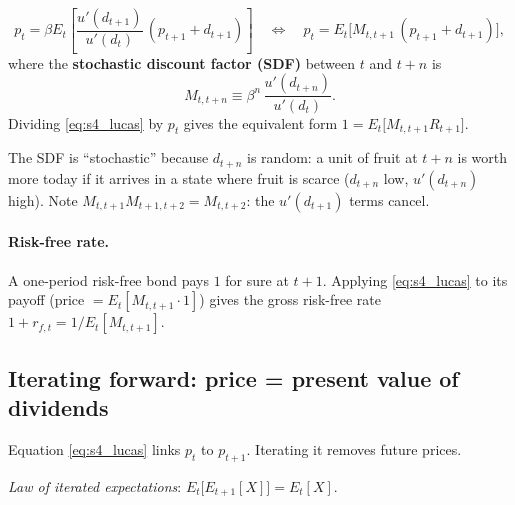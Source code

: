\begin{keybox}[title=Lucas asset-pricing formula]
\begin{equation}\label{eq:s4_lucas}
  p_t = \beta E_t\!\left[\frac{u'(d_{t+1})}{u'(d_t)}\,(p_{t+1}+d_{t+1})\right]
  \quad\Longleftrightarrow\quad
  p_t = E_t\big[M_{t,t+1}\,(p_{t+1}+d_{t+1})\big],
\end{equation}
where the \textbf{stochastic discount factor (SDF)} between $t$ and $t+n$ is
\begin{equation}\label{eq:s4_sdf}
  M_{t,t+n} \equiv \beta^n\,\frac{u'(d_{t+n})}{u'(d_t)} .
\end{equation}
Dividing \eqref{eq:s4_lucas} by $p_t$ gives the equivalent form $1 = E_t\big[M_{t,t+1}R_{t+1}\big]$.
\end{keybox}
The SDF is ``stochastic'' because $d_{t+n}$ is random: a unit of fruit at $t+n$ is worth more today if it arrives in a state where fruit is scarce ($d_{t+n}$ low, $u'(d_{t+n})$ high). Note $M_{t,t+1}M_{t+1,t+2}=M_{t,t+2}$: the $u'(d_{t+1})$ terms cancel.

\paragraph{Risk-free rate.} A one-period risk-free bond pays $1$ for sure at $t+1$. Applying \eqref{eq:s4_lucas} to its payoff (price $=E_t[M_{t,t+1}\cdot 1]$) gives the gross risk-free rate $1+r_{f,t} = 1/E_t[M_{t,t+1}]$.

\subsection{Iterating forward: price = present value of dividends }

Equation \eqref{eq:s4_lucas} links $p_t$ to $p_{t+1}$. Iterating it removes future prices.

\emph{Law of iterated expectations}: $E_t\big[E_{t+1}[X]\big]=E_t[X]$.

